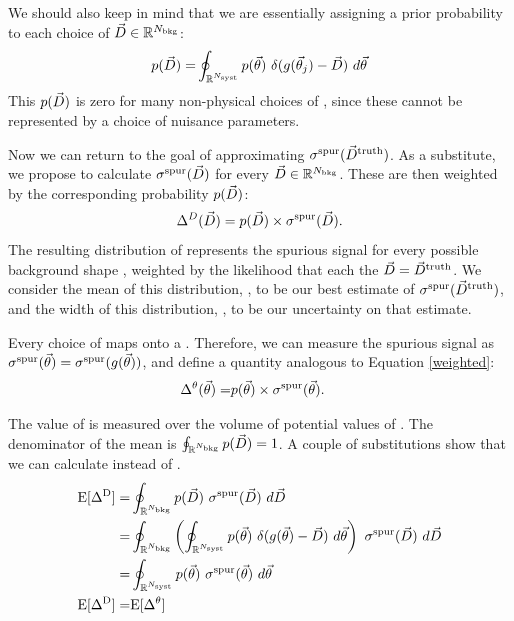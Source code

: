 We should also keep in mind that we are essentially assigning a prior probability to each choice of $\vec{D}\in\mathbb{R}^{N_\mathrm{bkg}}$:
\begin{equation}\label{dataProb}
\begin{split}
p(\vec{D}) =& \oint_{\mathbb{R}^{N_\mathrm{syst}}} p(\vec{\theta})~\delta(g(\vec{\theta}_j)-\vec{D})~d\vec{\theta} \\
\end{split}
\end{equation}
This $p(\vec{D})$ is zero for many non-physical choices of \template, since these cannot be represented by a choice of nuisance parameters.

Now we can return to the goal of approximating $\sigma^\mathrm{spur}(\vec{D}^\mathrm{truth})$. As a substitute, we propose to calculate $\sigma^\mathrm{spur}(\vec{D})$ for every $\vec{D}\in\mathbb{R}^{N_\mathrm{bkg}}$. These are then weighted by the corresponding probability $p(\vec{D})$:
\begin{equation}\label{weighted}
\Delta^D(\vec{D}) = p(\vec{D}) \times \sigma^\mathrm{spur}(\vec{D}).
\end{equation}
The resulting distribution of \deltaD represents the spurious signal for every possible background shape \template, weighted by the likelihood that each the $\vec{D}=\vec{D}^\mathrm{truth}$.
We consider the mean of this distribution, \meanD, to be our best estimate of $\sigma^\mathrm{spur}(\vec{D}^\mathrm{truth})$, and the width of this distribution, \stdD, to be our uncertainty on that estimate.

Every choice of \nps maps onto a \template. Therefore, we can measure the spurious signal as $\sigma^\mathrm{spur}(\vec{\theta})=\sigma^\mathrm{spur}(g(\vec{\theta}))$, and define a quantity analogous to Equation \ref{weighted}:
\begin{equation}\label{weighted2}
\begin{split}
\Delta^\theta(\vec{\theta}) =& p(\vec{\theta}) \times \sigma^\mathrm{spur}(\vec{\theta}).
\end{split}
\end{equation}

The value of \meanD is measured over the volume of potential values of \template. The denominator of the mean is $\oint_{\mathbb{R}^{N_\mathrm{bkg}}} p(\vec{D})=1$. A couple of substitutions show that we can calculate \meanTheta instead of \meanD.
\begin{equation}\label{meansEqual}
\begin{split}
\mathrm{\mathrm{E}[\Delta^D]} =& \oint_{\mathbb{R}^{N_\mathrm{bkg}}} p(\vec{D})~\sigma^\mathrm{spur}(\vec{D}) ~d\vec{D}  \\
           =& \oint_{\mathbb{R}^{N_\mathrm{bkg}}} \left(\oint_{\mathbb{R}^{N_\mathrm{syst}}} p(\vec{\theta})~\delta(g(\vec{\theta})-\vec{D})~d\vec{\theta}\right)~\sigma^\mathrm{spur}(\vec{D}) ~d\vec{D}  \\
           =& \oint_{\mathbb{R}^{N_\mathrm{syst}}} p(\vec{\theta})~\sigma^\mathrm{spur}(\vec{\theta})~d\vec{\theta}  \\
\mathrm{\mathrm{E}[\Delta^D]} =& \mathrm{\mathrm{E}[\Delta^\theta]} \\
\end{split}
\end{equation}

